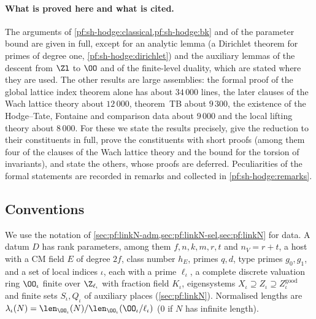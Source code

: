 \paragraph{What is proved here and what is cited.}
The arguments of \cref{pf:sh-hodge:classical,pf:sh-hodge:bk} and of the parameter bound are given in full, except for an
analytic lemma (a Dirichlet theorem for primes of degree one, \cref{pf:sh-hodge:dirichlet}) and the auxiliary lemmas of the
descent from $\Zl$ to $\OO$ and of the finite-level duality, which are stated where they are used. The other results are large
assemblies: the formal proof of the global lattice index theorem alone has about $34\,000$ lines, the later clauses of the Wach
lattice theory about $12\,000$, theorem~TB about $9\,300$, the existence of the Hodge--Tate, Fontaine and comparison data about
$9\,000$ and the local lifting theory about $8\,000$. For these we state the results precisely, give the reduction to their
constituents in full, prove the constituents with short proofs (among them four of the clauses of the Wach lattice theory and the
bound for the torsion of invariants), and state the others, whose proofs are deferred. Peculiarities of the formal statements are
recorded in remarks and collected in \cref{pf:sh-hodge:remarks}.

\subsection{Conventions}\label{pf:sh-hodge:conv}

We use the notation of \cref{sec:pf:linkN-adm,sec:pf:linkN-sel,sec:pf:linkN} for data. A datum $D$ has rank parameters,
among them $f,n,k,m,r,t$ and $n_V=r+t$, a host with a CM field $E$ of degree $2f$, class number $h_E$, primes $q,d$, type
primes $g_0,g_1$, and a set of local indices $\iota$, each with a prime $\ell_\iota$, a complete discrete valuation ring
$\OO_\iota$ finite over $\Z_{\ell_\iota}$ with fraction field $K_\iota$, eigensystems $X_\iota\supseteq Z_\iota\supseteq
Z^{\mathrm{good}}_\iota$ and finite sets $S_\iota,Q_\iota$ of auxiliary places (\cref{sec:pf:linkN}). Normalised lengths are
$\lambda_\iota(N)=\len_{\OO_\iota}(N)/\len_{\OO_\iota}(\OO_\iota/\ell_\iota)$ ($0$ if $N$ has infinite length).


